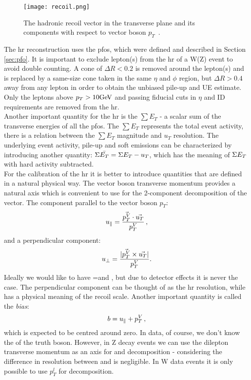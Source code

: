 	\begin{figure}[htpb]
		\texttt{[image: recoil.png]}
		\caption[Hadronic recoil]{The hadronic recoil vector in the transverse plane and its components with respect to vector boson $p_T$~\cite{int_note_hr}.}
		\label{fig::hr}
	\end{figure}
	The \gls{hr} reconstruction uses the \gls{pfos}, which were defined and described in Section \ref{sec:pfo}. It is important to exclude lepton(s) from the \gls{hr} of a W(Z) event to avoid double counting. A cone of $\Delta R <0.2$ is removed around the lepton(s) and is replaced by a same-size cone taken in the same $\eta$ and $\phi$ region, but $\Delta R >0.4$ away from any lepton in order to obtain the unbiased pile-up and UE estimate. Only the leptons above $p_T>10\text{Ge\kern -0.1em V}$ and passing fiducial cuts in $\eta$ and ID requirements are removed from the \gls{hr}. \\
	Another important quantity for the \gls{hr} is the $\sum E_T$ - a scalar sum of the transverse energies of all the \gls{pfos}. The $\sum E_T$ represents the total event activity, there is a relation between the $\sum E_T$ magnitude and $u_T$ resolution. The underlying event activity, pile-up and soft emissions can be characterized by introducing another quantity: $\Sigma \bar{E_T}  = \Sigma E_T -u_{T}$, which has the meaning of $\Sigma E_T$ with hard activity subtracted.\\
	For the calibration of the \gls{hr} it is better to introduce quantities that are defined in a natural physical way. The vector boson transverse momentum provides a natural axis which is convenient to use for the 2-component decomposition of the \ut vector. The \ut component parallel to the vector boson $p_T$:
	\begin{equation}
	u_{\parallel} =  \frac{\vec{p_{T}^{V}}\cdot\vec{u_{T}}}{p_{T}^{V}}\,,
	\end{equation}
	and a perpendicular component: 
	\begin{equation}
	u_{\perp} = \frac{|\vec{p_{T}^{V}}\times\vec{u_{T}}|}{p_{T}^{V}}.
	\end{equation}
	 Ideally we would like to have \upar=\ptv and , but due to detector effects it is never the case. The perpendicular component \uperp can be thought of as the \gls{hr} resolution, while \upar has a physical meaning of the recoil scale. Another important quantity is called the \textit{bias}:
	 \begin{equation}
	 b = u_{\parallel} + p_{T}^{V}\,,
	 \end{equation}
	 which is expected to be centred around zero. In data, of course, we don't know the \ptv of the truth boson. However, in Z decay events we can use the dilepton transverse momentum \ptll as an axis for \uperp and \upar decomposition - considering the difference in \ut resolution between \ptv and \ptll is negligible. In W data events it is only possible to use $p_T^l$ for \ut decomposition.
	 
